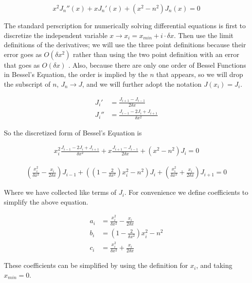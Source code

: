 \documentclass[onecolumn, groupedaddress, 10pt]{revtex4-1}
\begin{document}
\begin{equation}
\label{eqn:Bessel's Equation}
x^2 J_n''(x) + x J_n'(x) + (x^2 - n^2) J_n(x) = 0
\end{equation}

The standard perscription for numerically solving differential equations is first to discretize the independent variable $x \to x_i = x_{min} + i \cdot \delta x$.  Then use the limit definitions of the derivatives; we will use the three point definitions because their error goes as $O(\delta x^2)$ rather than using the two point definition with an error that goes as $O(\delta x)$ \cite{morten}.  Also, because there are only one order of Bessel Functions in Bessel's Equation, the order is implied by the $n$ that appears, so we will drop the subscript of $n$, $J_n \to J$, and we will further adopt the notation $J(x_i) = J_i$.

\begin{align}
J_i'  &= \frac{J_{i+1} - J_{i-1}}{2 \delta x} \\
J_i'' &= \frac{J_{i-1} - 2J_{i} + J_{i+1}}{\delta x^2}
\end{align}

So the discretized form of Bessel's Equation is

\begin{align}
\label{eqn:Bessel's Equation Discretized}
x_i^2 \frac{J_{i-1} - 2J_{i} + J_{i+1}}{\delta x^2} + x \frac{J_{i+1} - J_{i-1}}{2 \delta x} + (x^2 - n^2) J_i = 0
\end{align}

\begin{align}
\left(\frac{x_i^2}{\delta x^2} - \frac{x_i}{2\delta x}\right) J_{i-1}
	+ \left( \left(1-\frac{2}{\delta x^2}\right)x_i^2 - n^2 \right) J_i
	+ \left(\frac{x_i^2}{\delta x^2} + \frac{x_i}{2\delta x}\right) J_{i+1}
	= 0
\end{align}

Where we have collected like terms of $J_i$.  For convenience we define coefficients to simplify the above equation.

\begin{align}
a_i &= \frac{x_i^2}{\delta x^2} - \frac{x_i}{2\delta x} 	\\
b_i &= \left(1-\frac{2}{\delta x^2}\right)x_i^2 - n^2  	\\
c_i &= \frac{x_i^2}{\delta x^2} + \frac{x_i}{2\delta x}
\end{align}

These coefficients can be simplified by using the definition for $x_i$, and taking $x_{min} = 0$.
\end{document}
